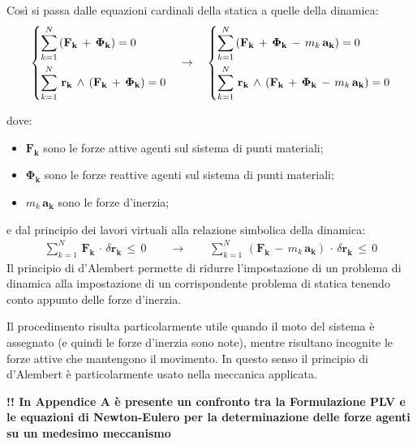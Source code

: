 Così si passa dalle equazioni cardinali della statica a quelle della dinamica:
\begin{gather*}
\begin{dcases}
\sum_{k=1}^{N}\,(\mathbf{F_k}\,+\,\mathbf{\Phi_k}) = 0\\
\sum_{k=1}^{N}\,\mathbf{r_k}\,\wedge\,(\mathbf{F_k}\,+\,\mathbf{\Phi_k}) = 0\\
\end{dcases}
\quad\rightarrow\quad
\begin{dcases}
\sum_{k=1}^{N}\,(\mathbf{F_k}\,+\,\mathbf{\Phi_k}\,-\,m_k\,\mathbf{a_k}) = 0\\
\sum_{k=1}^{N}\,\mathbf{r_k}\,\wedge\,(\mathbf{F_k}\,+\,\mathbf{\Phi_k}\,-\,m_k\,\mathbf{a_k}) = 0\\
\end{dcases}
\end{gather*}

dove:\begin{itemize}
\item $\mathbf{F_k}$ sono le forze attive agenti sul sistema di punti materiali;
\item $\mathbf{\Phi_k}$ sono le forze reattive agenti sul sistema di punti materiali;
\item $m_k\,\mathbf{a_k}$ sono le forze d'inerzia;
\end{itemize}

e dal principio dei lavori virtuali alla relazione simbolica della dinamica:
\begin{gather*}
\sum_{k=1}^N\,\mathbf{F_k}\,\cdot\,\delta \mathbf{r_k}\,\le\,0\qquad\rightarrow\qquad \sum_{k=1}^N\,(\mathbf{F_k}\,-\,m_k\,\mathbf{a_k})\,\cdot\,\delta \mathbf{r_k}\,\le\,0
\end{gather*}
Il principio di d'Alembert permette di ridurre l'impostazione di un problema di dinamica alla impostazione di un corrispondente problema di statica tenendo conto appunto delle forze d'inerzia.

Il procedimento risulta particolarmente utile quando il moto del sistema è assegnato (e quindi le forze d'inerzia sono note), mentre risultano incognite le forze attive che mantengono il movimento. In questo senso il principio di d'Alembert è particolarmente usato nella meccanica applicata.\newline

\textbf{!! In Appendice A è presente un confronto tra la Formulazione PLV e le equazioni di Newton-Eulero per la determinazione delle forze agenti su un medesimo meccanismo}
\newpage
